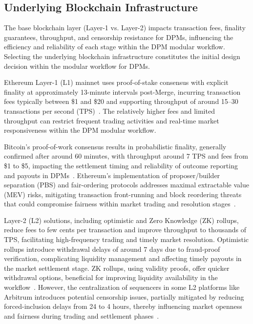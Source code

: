 {%

\subsection{Underlying Blockchain Infrastructure}\label{subsec:blockchain_infra}
The base blockchain layer (Layer-1 vs. Layer-2) impacts transaction fees, finality guarantees, throughput, and censorship resistance for DPMs, influencing the efficiency and reliability of each stage within the DPM modular workflow. Selecting the underlying blockchain infrastructure constitutes the initial design decision within the modular workflow for DPMs.

Ethereum Layer-1 (L1) mainnet uses proof-of-stake consensus with explicit finality at approximately 13-minute intervals post-Merge, incurring transaction fees typically between \$1 and \$20 and supporting throughput of around 15--30 transactions per second (TPS)~\cite{ClEsGS21}. The relatively higher fees and limited throughput can restrict frequent trading activities and real-time market responsiveness within the DPM modular workflow.

Bitcoin's proof-of-work consensus results in probabilistic finality, generally confirmed after around 60 minutes, with throughput around 7 TPS and fees from \$1 to \$5, impacting the settlement timing and reliability of outcome reporting and payouts in DPMs~\cite{BCFKMN14}. Ethereum's implementation of proposer/builder separation (PBS) and fair-ordering protocols addresses maximal extractable value (MEV) risks, mitigating transaction front-running and block reordering threats that could compromise fairness within market trading and resolution stages~\cite{BBDGJKLZ19}.

Layer-2 (L2) solutions, including optimistic and Zero Knowledge (ZK) rollups, reduce fees to few cents per transaction and improve throughput to thousands of TPS, facilitating high-frequency trading and timely market resolution. Optimistic rollups introduce withdrawal delays of around 7 days due to fraud-proof verification, complicating liquidity management and affecting timely payouts in the market settlement stage. ZK rollups, using validity proofs, offer quicker withdrawal options, beneficial for improving liquidity availability in the workflow~\cite{AKN21}. However, the centralization of sequencers in some L2 platforms like Arbitrum introduces potential censorship issues, partially mitigated by reducing forced-inclusion delays from 24 to 4 hours, thereby influencing market openness and fairness during trading and settlement phases~\cite{BNCD17}.

}
